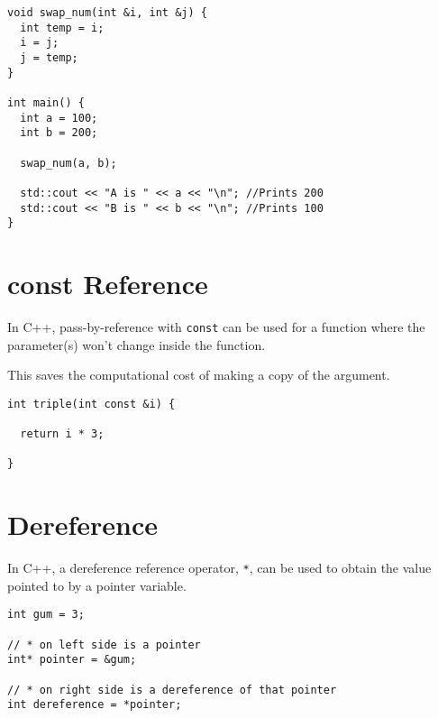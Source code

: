 \begin{verbatim}
void swap_num(int &i, int &j) {
  int temp = i;
  i = j;
  j = temp;
}
 
int main() {
  int a = 100;
  int b = 200;
 
  swap_num(a, b);
 
  std::cout << "A is " << a << "\n"; //Prints 200
  std::cout << "B is " << b << "\n"; //Prints 100
}
\end{verbatim}

\section{const Reference}
In C++, pass-by-reference with \verb!const! can be used for a function where the parameter(s) won’t change inside the function.

This saves the computational cost of making a copy of the argument.
\begin{verbatim}
int triple(int const &i) {
 
  return i * 3;
 
}
\end{verbatim}

\section{Dereference}
In C++, a dereference reference operator, \verb!*!, can be used to obtain the value pointed to by a pointer variable.
\begin{verbatim}
int gum = 3;
 
// * on left side is a pointer
int* pointer = &gum;
 
// * on right side is a dereference of that pointer
int dereference = *pointer;
\end{verbatim}
